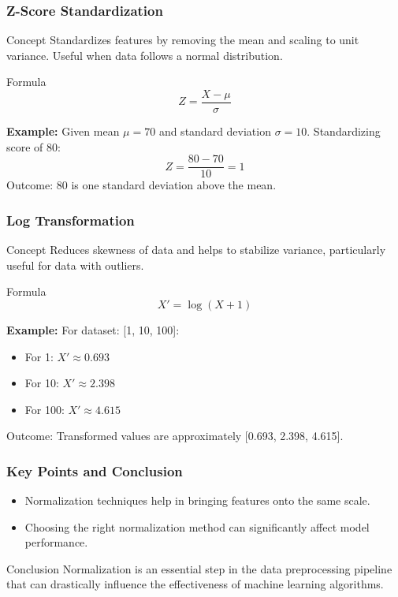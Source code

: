 \documentclass[aspectratio=169]{beamer}
\begin{document}
\begin{frame}[fragile]
    \frametitle{Z-Score Standardization}
    \begin{block}{Concept}
        Standardizes features by removing the mean and scaling to unit variance. Useful when data follows a normal distribution.
    \end{block}
    \begin{block}{Formula}
        \[
        Z = \frac{X - \mu}{\sigma}
        \]
    \end{block}
    \begin{example}
        \textbf{Example:} 
        Given mean \( \mu = 70 \) and standard deviation \( \sigma = 10 \).
        Standardizing score of 80:
        \[
        Z = \frac{80 - 70}{10} = 1
        \]
        Outcome: 80 is one standard deviation above the mean.
    \end{example}
\end{frame}

\begin{frame}[fragile]
    \frametitle{Log Transformation}
    \begin{block}{Concept}
        Reduces skewness of data and helps to stabilize variance, particularly useful for data with outliers.
    \end{block}
    \begin{block}{Formula}
        \[
        X' = \log(X + 1)
        \]
    \end{block}
    \begin{example}
        \textbf{Example:} 
        For dataset: [1, 10, 100]:
        \begin{itemize}
            \item For 1: \( X' \approx 0.693 \)
            \item For 10: \( X' \approx 2.398 \)
            \item For 100: \( X' \approx 4.615 \)
        \end{itemize}
        Outcome: Transformed values are approximately [0.693, 2.398, 4.615].
    \end{example}
\end{frame}

\begin{frame}[fragile]
    \frametitle{Key Points and Conclusion}
    \begin{itemize}
        \item Normalization techniques help in bringing features onto the same scale.
        \item Choosing the right normalization method can significantly affect model performance.
    \end{itemize}
    \begin{block}{Conclusion}
        Normalization is an essential step in the data preprocessing pipeline that can drastically influence the effectiveness of machine learning algorithms.
    \end{block}
\end{frame}
\end{document}
